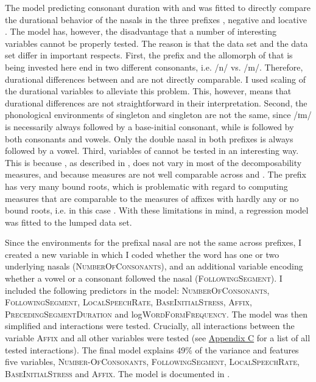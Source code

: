 The model predicting consonant duration with  and  was fitted to directly compare the durational behavior of the nasals in the three prefixes , negative  and locative . The model has, however, the disadvantage that a number of interesting variables cannot be properly tested. The reason is that the  data set and the data set differ in important respects.
First, the prefix  and the allomorph of  that is being invested here end in two different consonants, i.e.  /n/ vs. /m/. Therefore, durational differences between  and  are not directly comparable. I  used scaling of the durational variables to alleviate this problem. This, however, means that durational differences are not straightforward in their interpretation. 
Second, the phonological environments of singleton  and singleton  are not the same, since /ɪm/ is necessarily always followed by a base-initial consonant, while  is followed by both consonants and vowels. Only the double nasal in both prefixes is always followed by a vowel.
Third, variables of   cannot be tested in an interesting way. This is because , as described in , does not vary in most of the decomposability measures, and because  measures are not well comparable across  and . The prefix  has very many bound roots, which is problematic with regard to computing  measures that are comparable to the  measures of affixes with hardly any or no bound roots, i.e. in this case . 
With these limitations in mind, a regression model was fitted to the lumped data set.  

Since the environments for the prefixal nasal are not the same across prefixes, I created a new variable in which I coded whether the word has one or two underlying nasals (\textsc{NumberOfConsonants}), and an additional variable encoding whether a vowel or a consonant followed the nasal (\textsc{FollowingSegment}). I included the following predictors in the model: \textsc{NumberOfConsonants}, \textsc{FollowingSegment}, \textsc{LocalSpeechRate},  \textsc{BaseInitialStress}, \textsc{Affix}, \textsc{PrecedingSegmentDuration} and log\textsc{WordFormFrequency}.
The model was then simplified and interactions were tested. Crucially, all interactions between the variable \textsc{Affix} and all other variables were tested (see \hyperref[Appendix C: Summaries of tested interactions in corpus study]{Appendix C} for a list of all tested interactions). 
The final model explains 49\% of the variance and features five variables, \textsc{Number-OfConsonants}, \textsc{FollowingSegment}, \textsc{LocalSpeechRate}, \textsc{BaseInitialStress} and \textsc{Affix}. The model is documented in .





